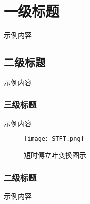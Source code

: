 \section{一级标题}
示例内容

\subsection{二级标题}
示例内容
\subsubsection{三级标题}
示例内容
\begin{figure}[ht]
    \begin{center}
                    
            \texttt{[image: STFT.png]}
            \caption{短时傅立叶变换图示}
    
    \end{center} 
\end{figure}

\subsubsection{二级标题}
示例内容
